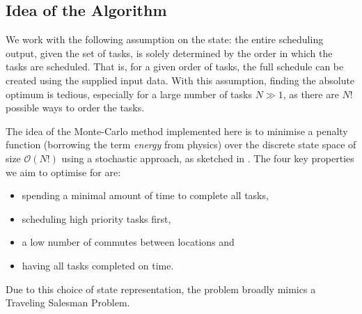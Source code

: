 \subsection{Idea of the Algorithm}
We work with the following assumption on the state: the entire scheduling output, given the set of tasks, is solely determined by the order in which the tasks are scheduled.
That is, for a given order of tasks, the full schedule can be created using the supplied input data.
With this assumption, finding the absolute optimum is tedious, especially for a large number of tasks $N \gg 1$, as there are $N!$ possible ways to order the tasks.

The idea of the Monte-Carlo method implemented here is to minimise a penalty function (borrowing the term \textit{energy} from physics) over the discrete state space of size $\mathcal{O}(N!)$ using a stochastic approach, as sketched in .
The four key properties we aim to optimise for are:
\begin{itemize}
  \tightlist
  \item spending a minimal amount of time to complete all tasks,
  \item scheduling high priority tasks first,
  \item a low number of commutes between locations and
  \item having all tasks completed on time.
\end{itemize}
Due to this choice of state representation, the problem broadly mimics a Traveling Salesman Problem.
